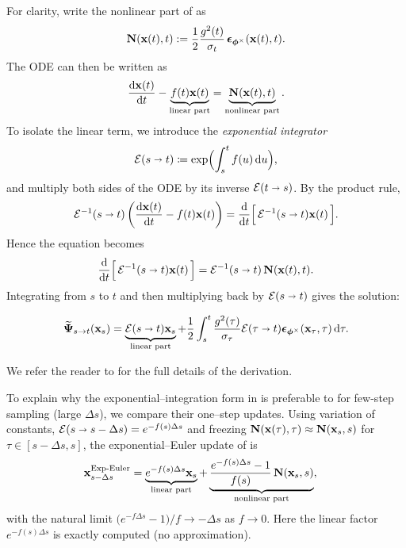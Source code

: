  For clarity, write the nonlinear part of  as
\[
{\mathbf{N}}({\mathbf{x}}(t), t) := \frac{1}{2}\frac{g^2(t)}{\sigma_t}\,{\bm{\epsilon}}_{\bm{\phi}^\times}({\mathbf{x}}(t), t).
\]
The ODE can then be written as
\begin{align}\label{eq:general-semilinear-pfode}
    \frac{\mathop{}\!\mathrm{d} {\mathbf{x}}(t)}{\mathop{}\!\mathrm{d} t} - \underbrace{f(t){\mathbf{x}}(t)}_{\text{linear part}} = \underbrace{{\mathbf{N}}({\mathbf{x}}(t), t)}_{\text{nonlinear part}}.
\end{align}
To isolate the linear term, we introduce the \emph{exponential integrator}
\[
\mathcal{E}(s \shortrightarrow t) \coloneqq \exp \Bigl(\int_s^t f(u) \mathop{}\!\mathrm{d} u\Bigr),
\]
and multiply both sides of the ODE by its inverse $\mathcal{E}(t \shortrightarrow s)$.
By the product rule,
\[
\mathcal{E}^{-1}(s \shortrightarrow t) \left(\frac{\mathop{}\!\mathrm{d} {\mathbf{x}}(t)}{\mathop{}\!\mathrm{d} t} - f(t){\mathbf{x}}(t)\right)
= \frac{\mathop{}\!\mathrm{d}}{\mathop{}\!\mathrm{d} t}\Big[\,\mathcal{E}^{-1}(s \shortrightarrow t){\mathbf{x}}(t)\,\Big].
\]
Hence the equation becomes
\[
\frac{\mathop{}\!\mathrm{d}}{\mathop{}\!\mathrm{d} t}\Big[\,\mathcal{E}^{-1}(s \shortrightarrow t){\mathbf{x}}(t)\,\Big]
= \mathcal{E}^{-1}(s \shortrightarrow t)\,{\mathbf{N}}({\mathbf{x}}(t), t).
\]
Integrating from $s$ to $t$ and then multiplying back by $\mathcal{E}(s \shortrightarrow t)$ gives the solution:
\begin{mdframed}
    \begin{equation}\label{eq:variation_of_constants}
\widetilde{{\bm{\Psi}}}_{s\to t}({\mathbf{x}}_s)
= \underbrace{\mathcal{E}(s \shortrightarrow t){\mathbf{x}}_s}_{\text{linear part}}
+ \frac{1}{2}\int_s^t \frac{g^2(\tau)}{\sigma_\tau} 
\mathcal{E}(\tau \shortrightarrow t) 
{\bm{\epsilon}}_{\bm{\phi}^\times}({\mathbf{x}}_\tau,\tau) \mathop{}\!\mathrm{d}\tau.
\end{equation}
\end{mdframed}
We refer the reader to  for the full details of the derivation.

To explain why the exponential–integration form in  is preferable to  for few-step sampling (large $\Delta s$), we compare their one–step updates. Using variation of constants, $\mathcal{E}(s\shortrightarrow s-\Delta s)=e^{-f(s)\Delta s}$ and freezing ${\mathbf{N}}({\mathbf{x}}(\tau),\tau)\approx {\mathbf{N}}({\mathbf{x}}_s,s)$ for $\tau\in[s-\Delta s,s]$, the exponential–Euler update of  is
\begin{align}\label{eq:exp-euler-step}
&{\mathbf{x}}^{\mathrm{Exp}\text{-}\mathrm{Euler}}_{s-\Delta s}
= \underbrace{e^{-f(s)\Delta s}{\mathbf{x}}_s}_{\text{linear part}}
+\underbrace{\frac{e^{-f(s)\Delta s}-1}{f(s)}\,{\mathbf{N}}({\mathbf{x}}_s,s)}_{\text{nonlinear part}},
\end{align}
with the natural limit $\bigl(e^{-f\Delta s}-1\bigr)/f\to -\Delta s$ as $f\to 0$. Here the linear factor $e^{-f(s)\Delta s}$ is exactly computed (no approximation).

